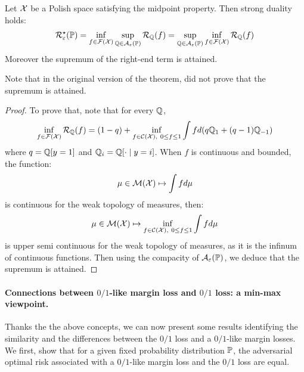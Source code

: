 \begin{thm}
Let $\mathcal{X}$ be a Polish space satisfying the midpoint property. Then strong duality holds:
\begin{align*}
\mathcal{R}^\star_\varepsilon(\mathbb{P}) = \inf_{f\in\mathcal{F}(\mathcal{X})}\sup_{\mathbb{Q}\in\mathcal{A}_\varepsilon(\mathbb{P})} \mathcal{R}_{\mathbb{Q}}(f) =    \sup_{\mathbb{Q}\in\mathcal{A}_\varepsilon(\mathbb{P})} \inf_{f\in\mathcal{F}(\mathcal{X})} \mathcal{R}_{\mathbb{Q}}(f)
\end{align*}
Moreover the supremum of the right-end term is attained. 
\end{thm}
Note that in the original version of the theorem, \citet{pydi2021many} did not prove that the supremum is attained. 
\begin{proof}
    To prove that, note that for every $\mathbb{Q}$,
\begin{align*}
    \inf_{f\in\mathcal{F}(\mathcal{X})} \mathcal{R}_{\mathbb{Q}}(f) = (1-q)+\inf_{f\in\mathcal{C}(\mathcal{X}),~0\leq f\leq 1} \int f d(q\mathbb{Q}_1 +(q-1)\mathbb{Q}_{-1})
\end{align*}
where $q =\mathbb{Q}[y=1]$ and $\mathbb{Q}_i = \mathbb{Q}[\cdot\mid y=i]$. When $f$ is continuous and bounded, the function:
\begin{align*}
   \mu\in\mathcal{M}(\mathcal{X})\mapsto\int f d\mu
\end{align*}
is continuous for the weak topology of measures, then: 
\begin{align*}
    \mu\in\mathcal{M}(\mathcal{X})\mapsto\inf_{f\in\mathcal{C}(\mathcal{X}),~0\leq f\leq 1}\int f d\mu 
\end{align*}
is upper semi continuous for the weak topology of measures, as it is the infinum of continuous functions. Then using the compacity of $\mathcal{A}_\varepsilon(\mathbb{P})$, we deduce that the supremum is attained.
\end{proof}



\paragraph{Connections between $0/1$-like margin loss and $0/1$ loss: a min-max viewpoint.} Thanks the the above concepts, we can now present some results identifying the similarity and the differences between the  $0/1$ loss and a $0/1$-like margin losses. We first, show that for a given fixed probability distribution $\mathbb{P}$, the adversarial optimal risk associated with a $0/1$-like margin loss and the $0/1$ loss are equal.

